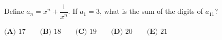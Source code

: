 Define $a_n=x^n+\dfrac1{x^n}$. If $a_1=3$, what is the sum of the digits of $a_{11}$?

$\textbf{(A) }17\qquad\textbf{(B) }18\qquad\textbf{(C) }19\qquad\textbf{(D) }20\qquad\textbf{(E) }21$

